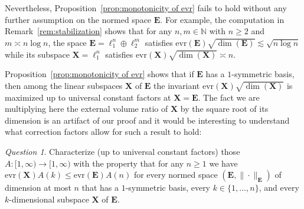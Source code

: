 \documentclass[11pt,reqno]{amsart}
\renewcommand{\le}{\leqslant}
\renewcommand{\ge}{\geqslant}
\newcommand{\evr}{\mathrm{evr}}
\newcommand{\n}{\{1,\ldots,n\}}
\newcommand{\X}{\mathbf X}
\theoremstyle{remark}
\newtheorem{question}[theorem]{Question}
\newcommand{\N}{\mathbb N}
\renewcommand{\1}{\mathbf 1}
\newcommand{\bfE}{\mathbf{E}}
\begin{document}
Nevertheless, Proposition~\ref{prop:monotonicity of evr} fails to  hold without any further assumption on the normed space $\bfE$. For example, the computation in  Remark~\ref{rem:stabilization} shows that for any $n,m\in \N$ with $n\ge 2$ and $m\asymp n\log n$, the space $\bfE=\ell_1^n\oplus \ell_2^m$ satisfies $\evr(\bfE)\sqrt{\dim(\bfE)}\lesssim \sqrt{n\log n}$ while its subspace $\X=\ell_1^n$ satisfies $\evr(\X)\sqrt{\dim(\X)}\asymp n$.



Proposition~\ref{prop:monotonicity of evr}  shows that if $\bfE$ has a $1$-symmetric basis, then among the linear subspaces $\X$ of $\bfE$ the invariant $\evr(\X)\sqrt{\dim(\X)}$ is maximized up to universal constant factors  at $\X=\bfE$. The fact we are multiplying here the external volume ratio of $\X$ by the square root of its dimension is an artifact of our proof and it would be interesting to understand  what  correction factors allow for such a result to hold:

\begin{question}\label{Q:An} Characterize (up to universal constant factors) those  $A:[1,\infty)\to [1,\infty)$ with the property that for any $n\ge 1$ we have $\evr(\X)A(k)\le \evr(\bfE)A(n)$ for every  normed space $(\bfE,\|\cdot\|_\bfE)$ of dimension at most $n$ that has a $1$-symmetric basis, every $k\in \n$, and every $k$-dimensional subspace $\X$ of $\bfE$.
\end{question}
\end{document}
